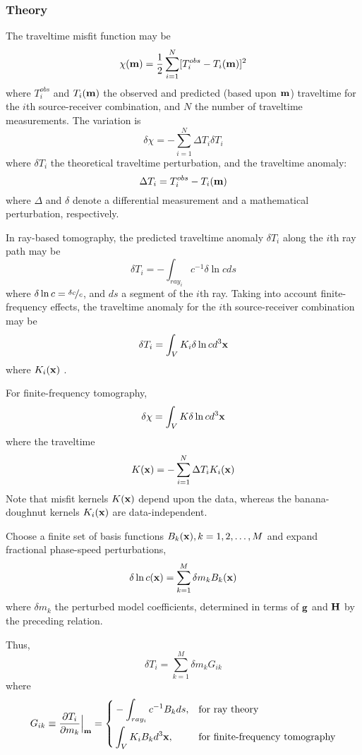 \subsubsection{Theory}
The traveltime misfit function may be
\[ \chi(\mathbf{m})=\frac{1}{2}\sum_{i=1}^N[T_i^{obs}-T_i(\mathbf{m})]^2 \]
where $T_i^{obs}$ and $T_i(\mathbf{m})$ the observed and predicted (based upon $\mathbf{m}$) traveltime for the $i$th source-receiver combination, and $N$ the number of traveltime measurements. The variation is
\[ \delta\chi=-\sum_{i=1}^N\Delta T_i\delta T_i \]
where $\delta T_i$ the theoretical traveltime perturbation, and the traveltime anomaly:
\[ \Delta T_i=T_i^{obs}-T_i(\mathbf{m}) \]
where $\Delta$ and $\delta$ denote a differential measurement and a mathematical perturbation, respectively.\par
In ray-based tomography, the predicted traveltime anomaly $\delta T_i$ along the $i$th ray path may be
\[ \delta T_i=-\int_{ray_i}c^{-1}\delta\ln cds \]
where  $\delta\ln c=\nicefrac{\delta c}{c}$, and $ds$ a segment of the $i$th ray. Taking into account finite-frequency effects, the traveltime anomaly for the $i$th source-receiver combination may be
\[ \delta T_i=\int_VK_i\delta\ln cd^3\mathbf{x} \]
where $K_i(\mathbf{x})$ .\par
For finite-frequency tomography,
\[ \delta\chi=\int_VK\delta\ln cd^3\mathbf{x} \]
where the traveltime 
\[ K(\mathbf{x})=-\sum_{i=1}^N\Delta T_iK_i(\mathbf{x}) \]
Note that misfit kernels $K(\mathbf{x})$ depend upon the data, whereas the banana-doughnut kernels $K_i(\mathbf{x})$ are data-independent.\par
Choose a finite set of basis functions $B_k(\mathbf{x}),k=1,2,\ldots,M$ and expand fractional phase-speed perturbations,
\[ \delta\ln c(\mathbf{x})=\sum_{k=1}^M\delta m_kB_k(\mathbf{x}) \]
where $\delta m_k$ the perturbed model coefficients, determined in terms of $\mathbf{g}$ and $\mathbf{H}$ by the preceding relation.\par
Thus,
\[ \delta T_i=\sum_{k=1}^M\delta m_kG_{ik} \]
where
\begin{equation*}
  G_{ik}\equiv\frac{\partial T_i}{\partial m_k}\Big|_{\mathbf{m}}=\left\{
  \begin{aligned}
    & -\int_{ray_i}c^{-1}B_kds, & & \text{for ray theory} \\
    & \int_VK_iB_kd^3\mathbf{x}, & & \text{for finite-frequency tomography} \\
  \end{aligned} \right.
\end{equation*}\par
